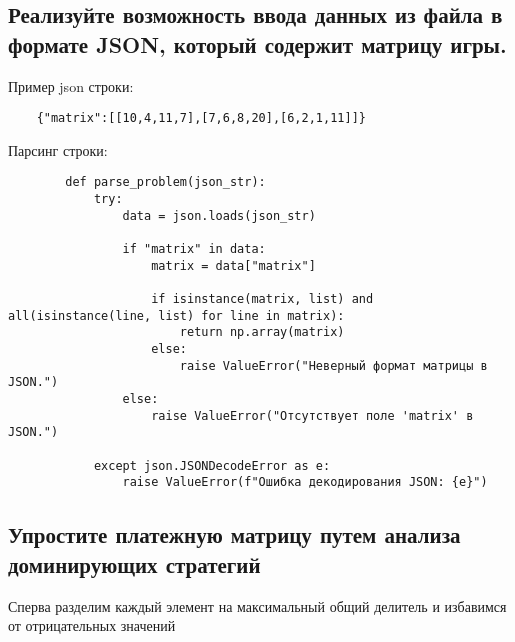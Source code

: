 \documentclass{article}
\begin{document}
\subsection{Реализуйте возможность ввода данных из файла в формате JSON, который содержит матрицу игры.}

Пример json строки:
\begin{listing}[H]
    \begin{verbatim}
    {"matrix":[[10,4,11,7],[7,6,8,20],[6,2,1,11]]}
    \end{verbatim}
\end{listing}

Парсинг строки:

\begin{listing}[H]
    \begin{verbatim}
        def parse_problem(json_str):
            try:
                data = json.loads(json_str)

                if "matrix" in data:
                    matrix = data["matrix"]

                    if isinstance(matrix, list) and all(isinstance(line, list) for line in matrix):
                        return np.array(matrix)
                    else:
                        raise ValueError("Неверный формат матрицы в JSON.")
                else:
                    raise ValueError("Отсутствует поле 'matrix' в JSON.")

            except json.JSONDecodeError as e:
                raise ValueError(f"Ошибка декодирования JSON: {e}")
        \end{verbatim}
\end{listing}

\subsection{Упростите платежную матрицу путем анализа доминирующих стратегий}

Сперва разделим каждый элемент на максимальный общий делитель и избавимся от отрицательных значений
\end{document}
